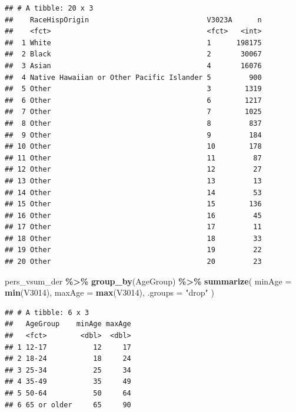 \documentclass[
]{krantz}
\makeatletter
\newenvironment{Shaded}{\begin{snugshade}}{\end{snugshade}}
\newcommand{\AttributeTok}[1]{\textcolor[rgb]{0.27,0.27,0.27}{#1}}
\newcommand{\FunctionTok}[1]{\textcolor[rgb]{0.27,0.27,0.27}{\textbf{#1}}}
\newcommand{\NormalTok}[1]{#1}
\newcommand{\SpecialCharTok}[1]{\textcolor[rgb]{0.43,0.43,0.43}{\textbf{#1}}}
\newcommand{\StringTok}[1]{\textcolor[rgb]{0.5,0.5,0.5}{#1}}
\newenvironment{kframe}{%
\medskip{}
\setlength{\fboxsep}{.8em}
 \def\at@end@of@kframe{}%
 \ifinner\ifhmode%
  \def\at@end@of@kframe{\end{minipage}}%
  \begin{minipage}{\columnwidth}%
 \fi\fi%
 \def\FrameCommand##1{\hskip\@totalleftmargin \hskip-\fboxsep
 \colorbox{shadecolor}{##1}\hskip-\fboxsep
     \hskip-\linewidth \hskip-\@totalleftmargin \hskip\columnwidth}%
 \MakeFramed {\advance\hsize-\width
   \@totalleftmargin\z@ \linewidth\hsize
   \@setminipage}}%
 {\par\unskip\endMakeFramed%
 \at@end@of@kframe}
\renewenvironment{Shaded}{\begin{kframe}}{\end{kframe}}
\makeatother
\begin{document}
\begin{verbatim}
## # A tibble: 20 x 3
##    RaceHispOrigin                            V3023A      n
##    <fct>                                     <fct>   <int>
##  1 White                                     1      198175
##  2 Black                                     2       30067
##  3 Asian                                     4       16076
##  4 Native Hawaiian or Other Pacific Islander 5         900
##  5 Other                                     3        1319
##  6 Other                                     6        1217
##  7 Other                                     7        1025
##  8 Other                                     8         837
##  9 Other                                     9         184
## 10 Other                                     10        178
## 11 Other                                     11         87
## 12 Other                                     12         27
## 13 Other                                     13         13
## 14 Other                                     14         53
## 15 Other                                     15        136
## 16 Other                                     16         45
## 17 Other                                     17         11
## 18 Other                                     18         33
## 19 Other                                     19         22
## 20 Other                                     20         23
\end{verbatim}

\begin{Shaded}
\begin{Highlighting}[]
\NormalTok{pers\_vsum\_der }\SpecialCharTok{\%\textgreater{}\%}
  \FunctionTok{group\_by}\NormalTok{(AgeGroup) }\SpecialCharTok{\%\textgreater{}\%}
  \FunctionTok{summarize}\NormalTok{(}
    \AttributeTok{minAge =} \FunctionTok{min}\NormalTok{(V3014),}
    \AttributeTok{maxAge =} \FunctionTok{max}\NormalTok{(V3014),}
    \AttributeTok{.groups =} \StringTok{"drop"}
\NormalTok{  )}
\end{Highlighting}
\end{Shaded}

\begin{verbatim}
## # A tibble: 6 x 3
##   AgeGroup    minAge maxAge
##   <fct>        <dbl>  <dbl>
## 1 12-17           12     17
## 2 18-24           18     24
## 3 25-34           25     34
## 4 35-49           35     49
## 5 50-64           50     64
## 6 65 or older     65     90
\end{verbatim}
\end{document}
